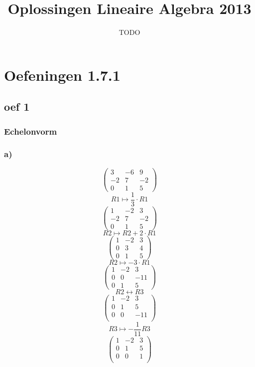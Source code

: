 \documentclass[10pt,a4paper]{article}
\title{Oplossingen Lineaire Algebra 2013}
\author{TODO}
\begin{document}
\maketitle
\pagebreak
\tableofcontents
\pagebreak


\section{Oefeningen 1.7.1}
\subsection*{oef 1}
\subsubsection*{Echelonvorm}
\subsubsection*{a)}

$$\begin{pmatrix}
3 & -6 & 9\\
-2 & 7 & -2\\
0 & 1 & 5
\end{pmatrix}
$$
$$ R1 \longmapsto \frac{1}{3}\cdot R1$$
$$\begin{pmatrix}
1 & -2 & 3\\
-2 & 7 & -2\\
0 & 1 & 5
\end{pmatrix}
$$
$$R2 \longmapsto R2 + 2\cdot R1$$
$$\begin{pmatrix}
1 & -2 & 3\\
0 & 3 & 4\\
0 & 1 & 5
\end{pmatrix}
$$
$$
R2 \longmapsto - 3\cdot R1
$$
$$\begin{pmatrix}
1 & -2 & 3\\
0 & 0 & -11\\
0 & 1 & 5
\end{pmatrix}
$$
$$R2 \leftrightarrow R3$$
$$\begin{pmatrix}
1 & -2 & 3\\
0 & 1 & 5\\
0 & 0 & -11\\
\end{pmatrix}
$$
$$R3 \longmapsto -\frac{1}{11} R3$$
$$\begin{pmatrix}
1 & -2 & 3\\
0 & 1 & 5\\
0 & 0 & 1\\
\end{pmatrix}
$$
\end{document}
